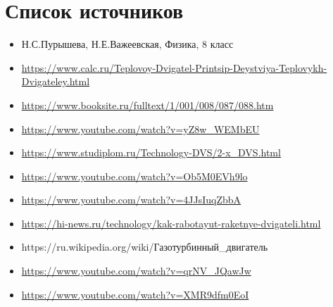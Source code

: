 \documentclass[a4paper,14pt]{article}
\begin{document}
    \pagebreak
    \section{Список источников}
    \begin{itemize}
        \item Н.С.Пурышева, Н.Е.Важеевская, Физика, 8 класс
        \item \url{https://www.calc.ru/Teplovoy-Dvigatel-Printsip-Deystviya-Teplovykh-Dvigateley.html}
        \item \url{https://www.booksite.ru/fulltext/1/001/008/087/088.htm}
        \item \url{https://www.youtube.com/watch?v=yZ8w_WEMbEU}
        \item \url{https://www.studiplom.ru/Technology-DVS/2-x_DVS.html}
        \item \url{https://www.youtube.com/watch?v=Ob5M0EVh9lo}
        \item \url{https://www.youtube.com/watch?v=4JJsIuqZbbA}
        \item \url{https://hi-news.ru/technology/kak-rabotayut-raketnye-dvigateli.html}
        \item https://ru.wikipedia.org/wiki/Газотурбинный\_двигатель%
        \item \url{https://www.youtube.com/watch?v=qrNV_JQawJw}
        \item \url{https://www.youtube.com/watch?v=XMR9dfm0EoI}
    \end{itemize}
\end{document}
